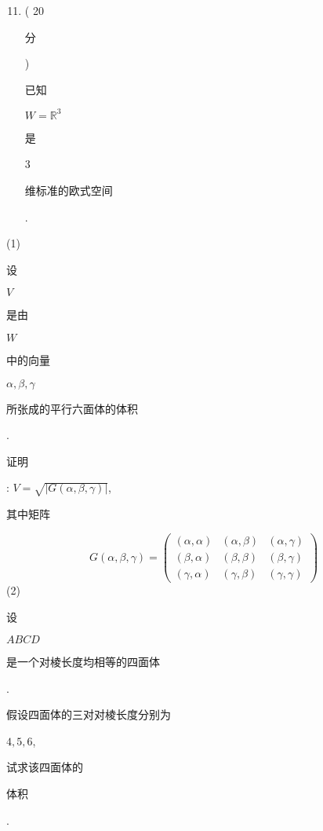 \documentclass[10pt]{article}
\begin{document}
\begin{enumerate}
  \setcounter{enumi}{10}
  \item ( 20 \begin{CJK}{UTF8}{mj}分\end{CJK}) \begin{CJK}{UTF8}{mj}已知\end{CJK} $W=\mathbb{R}^{3}$ \begin{CJK}{UTF8}{mj}是\end{CJK} 3 \begin{CJK}{UTF8}{mj}维标准的欧式空间\end{CJK}.
\end{enumerate}
(1) \begin{CJK}{UTF8}{mj}设\end{CJK} $V$ \begin{CJK}{UTF8}{mj}是由\end{CJK} $W$ \begin{CJK}{UTF8}{mj}中的向量\end{CJK} $\alpha, \beta, \gamma$ \begin{CJK}{UTF8}{mj}所张成的平行六面体的体积\end{CJK}. \begin{CJK}{UTF8}{mj}证明\end{CJK}: $V=\sqrt{|G(\alpha, \beta, \gamma)|}$, \begin{CJK}{UTF8}{mj}其中矩阵\end{CJK}
$$
G(\alpha, \beta, \gamma)=\left(\begin{array}{lll}
(\alpha, \alpha) & (\alpha, \beta) & (\alpha, \gamma) \\
(\beta, \alpha) & (\beta, \beta) & (\beta, \gamma) \\
(\gamma, \alpha) & (\gamma, \beta) & (\gamma, \gamma)
\end{array}\right)
$$
(2) \begin{CJK}{UTF8}{mj}设\end{CJK} $A B C D$ \begin{CJK}{UTF8}{mj}是一个对棱长度均相等的四面体\end{CJK}. \begin{CJK}{UTF8}{mj}假设四面体的三对对棱长度分别为\end{CJK} $4,5,6$, \begin{CJK}{UTF8}{mj}试求该四面体的\end{CJK} \begin{CJK}{UTF8}{mj}体积\end{CJK}.
\end{document}
